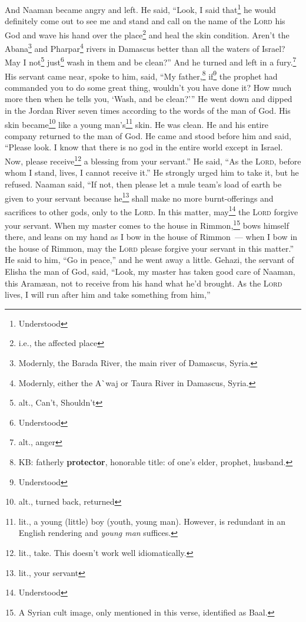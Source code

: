 \begin{inparaenum}
     And Naaman became angry and left. He said, ``Look, I said that\footnote{Understood} he would definitely come out to see me and stand and call on the name of the \textsc{Lord} his God and wave his hand over the place\footnote{i.e., the affected place} and heal the skin condition.%
     Aren't the Abana\footnote{Modernly, the Barada River, the main river of Damascus, Syria.} and Pharpar\footnote{Modernly, either the A\`{}waj or Taura River in Damascus, Syria.} rivers in Damascus better than all the waters of Israel? May I not\footnote{alt., Can't, Shouldn't} just\footnote{Understood} wash in them and be clean?'' And he turned and left in a fury.\footnote{alt., anger}%
     His servant came near, spoke to him, said, ``My father,\footnote{KB: fatherly \textbf{protector}, honorable title: of one's elder, prophet, husband.} if\footnote{Understood} the prophet had commanded you to do some great thing, wouldn't you have done it? How much more then when he tells you, `Wash, and be clean?'\thinspace''%
     He went down and dipped in the Jordan River seven times according to the words of the man of God. His skin became\footnote{alt., turned back, returned} like a young man's\footnote{lit., a young (little) boy (youth, young man). However,  is redundant in an English rendering and \textit{young man} suffices.} skin. He was clean.%
     He and his entire company returned to the man of God. He came and stood before him and said, ``Please look. I know that there is no god in the entire world except in Israel. Now, please receive\footnote{lit., take. This doesn't work well idiomatically.} a blessing from your servant.''%
     He said, ``As the \textsc{Lord}, before whom I stand, lives, I cannot receive it.'' He strongly urged him to take it, but he refused.%
     Naaman said, ``If not, then please let a mule team's load of earth be given to your servant because he\footnote{lit., your servant} shall make no more burnt-offerings and sacrifices to other gods, only to the \textsc{Lord}.%
     In this matter, may\footnote{Understood} the \textsc{Lord} forgive your servant. When my master comes to the house in Rimmon,\footnote{A Syrian cult image, only mentioned in this verse, identified as Baal.} bows himself there, and leans on my hand as I bow in the house of Rimmon~--- when I bow in the house of Rimmon, may the \textsc{Lord} please forgive your servant in this matter.''%
     He said to him, ``Go in peace,'' and he went away a little.%
     Gehazi, the servant of Elisha the man of God, said, ``Look, my master has taken good care of Naaman, this Aram\ae{}an, not to receive from his hand what he'd brought. As the \textsc{Lord} lives, I will run after him and take something from him,''%

\end{inparaenum}
